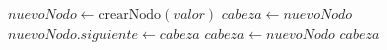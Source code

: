 \documentclass[border=10pt]{standalone} %
\begin{document}
\begin{algorithmic}[1]
      \State $nuevoNodo \gets \text{crearNodo}(valor)$
        \State $cabeza \gets nuevoNodo$
      \Else
        \State $nuevoNodo.siguiente \gets cabeza$
        \State $cabeza \gets nuevoNodo$
      \EndIf
      \State \Return $cabeza$
    \EndProcedure
\end{algorithmic}
\end{document}
